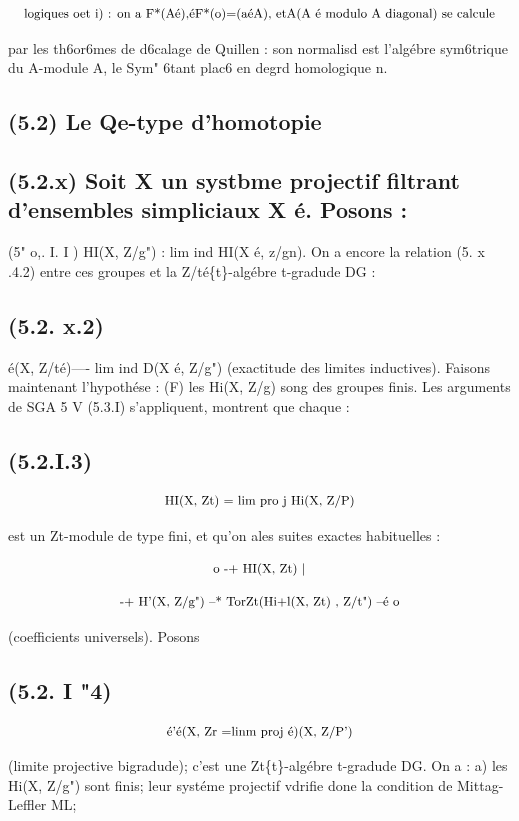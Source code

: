 \documentclass[11pt]{article}
\theoremstyle{remark}
\begin{document}
\[\text{\small logiques oet i) : on a F*(Aé),éF*(o)=(aéA), etA(A é modulo A diagonal) se calcule}\]

par les th6or6mes de d6calage de Quillen : son normalisd est l'algébre sym6trique du A-module A, le Sym" 6tant plac6 en degrd homologique n.

\subsection*{(5.2) Le Qe-type d'homotopie}

\subsection*{(5.2.x) Soit X un systbme projectif filtrant d'ensembles simpliciaux X é. Posons :}

(5" o,. I. I ) HI(X, Z/g") : lim ind HI(X é, z/gn). On a encore la relation (5. x .4.2) entre ces groupes et la Z/té\{t\}-algébre t-gradude DG :

\subsection*{(5.2. x.2)}

é(X, Z/té)---- lim ind D(X é, Z/g") (exactitude des limites inductives). Faisons maintenant l'hypothése : (F) les Hi(X, Z/g) song des groupes finis. Les arguments de SGA 5 V (5.3.I) s'appliquent, montrent que chaque :

\subsection*{(5.2.I.3)}

\[\text{\small HI(X, Zt) = lim pro j Hi(X, Z/P)}\]

est un Zt-module de type fini, et qu'on ales suites exactes habituelles :

\[\text{\small o -+ HI(X, Zt) |}\]

\[\text{\small -+ H'(X, Z/g") --* TorZt(Hi+l(X, Zt) , Z/t") --é o}\]

(coefficients universels). Posons

\subsection*{(5.2. I "4)}

\[\text{\small é'é(X, Zr =linm proj é)(X, Z/P')}\]

(limite projective bigradude); c'est une Zt\{t\}-algébre t-gradude DG. On a : a) les Hi(X, Z/g") sont finis; leur systéme projectif vdrifie done la condition de Mittag- Leffler ML;
\end{document}
